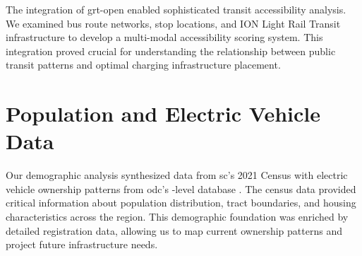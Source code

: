 

The integration of \gls{grt-open} \cite{row_opendata_2024} enabled sophisticated transit accessibility analysis. We examined bus route networks, stop locations, and ION Light Rail Transit infrastructure to develop a multi-modal accessibility scoring system. This integration proved crucial for understanding the relationship between public transit patterns and optimal charging infrastructure placement.

\section{Population and Electric Vehicle Data}



Our demographic analysis synthesized data from \gls{sc}'s 2021 Census \cite{statcan_census_2021} with electric vehicle ownership patterns from \gls{odc}'s -level database \cite{ontario_data_2024}. The census data provided critical information about population distribution, tract boundaries, and housing characteristics across the region. This demographic foundation was enriched by detailed  registration data, allowing us to map current ownership patterns and project future infrastructure needs.